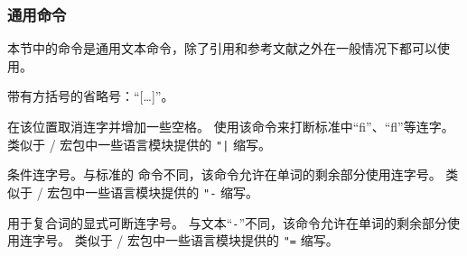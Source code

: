 \subsubsection{通用命令}%
\label{use:fmt:aux}

本节中的命令是通用文本命令，除了引用和参考文献之外在一般情况下都可以使用。

\begin{ltxsyntax}


带有方括号的省略号：“[\dots\unkern]”。



在该位置取消连字并增加一些空格。
使用该命令来打断标准中“fi”、“fl”等连字。
类似于 / 宏包中一些语言模块提供的 \verb+"|+ 缩写。



条件连字号。与标准的 \cmd{-} 命令不同，该命令允许在单词的剩余部分使用连字号。
类似于 / 宏包中一些语言模块提供的 \verb+"-+ 缩写。



用于复合词的显式可断连字号。
与文本“\texttt{-}”不同，该命令允许在单词的剩余部分使用连字号。
类似于 / 宏包中一些语言模块提供的 \verb+"=+ 缩写。


\end{ltxsyntax}
